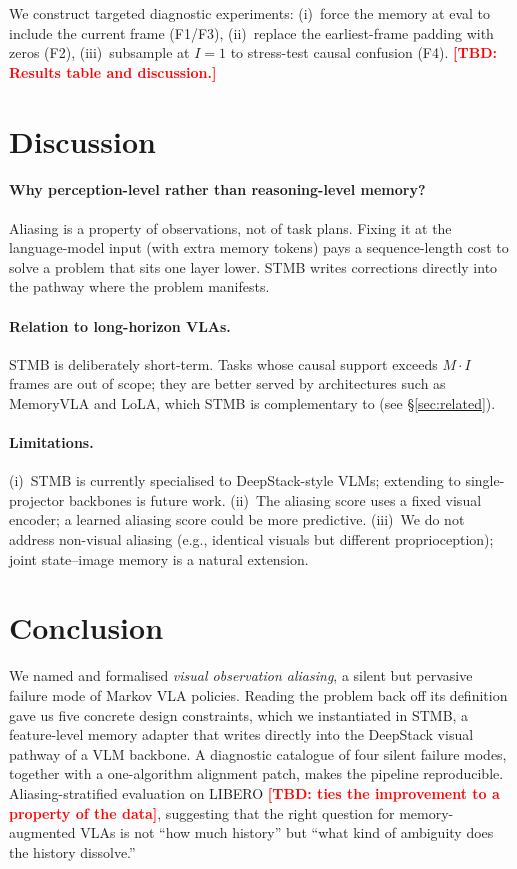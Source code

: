 \documentclass[11pt]{article}
\newcommand{\todo}[1]{\textcolor{red}{\textbf{[TBD: #1]}}}
\begin{document}
We construct targeted diagnostic experiments: (i)~force the memory at eval to
include the current frame (F1/F3), (ii)~replace the earliest-frame padding with
zeros (F2), (iii)~subsample at $I{=}1$ to stress-test causal confusion (F4).
\todo{Results table and discussion.}

\section{Discussion}
\label{sec:discussion}

\paragraph{Why perception-level rather than reasoning-level memory?}
Aliasing is a property of observations, not of task plans. Fixing it at the
language-model input (with extra memory tokens) pays a sequence-length cost
to solve a problem that sits one layer lower. STMB writes corrections directly
into the pathway where the problem manifests.

\paragraph{Relation to long-horizon VLAs.}
STMB is deliberately short-term. Tasks whose causal support exceeds $M \cdot I$
frames are out of scope; they are better served by architectures such as
MemoryVLA and LoLA, which STMB is complementary to (see \S\ref{sec:related}).

\paragraph{Limitations.}
(i)~STMB is currently specialised to DeepStack-style VLMs; extending to
single-projector backbones is future work. (ii)~The aliasing score uses a
fixed visual encoder; a learned aliasing score could be more predictive.
(iii)~We do not address non-visual aliasing (e.g., identical visuals but
different proprioception); joint state--image memory is a natural extension.

\section{Conclusion}

We named and formalised \emph{visual observation aliasing}, a silent but
pervasive failure mode of Markov VLA policies. Reading the problem back off its
definition gave us five concrete design constraints, which we instantiated in
STMB, a feature-level memory adapter that writes directly into the DeepStack
visual pathway of a VLM backbone. A diagnostic catalogue of four silent
failure modes, together with a one-algorithm alignment patch, makes the
pipeline reproducible.
Aliasing-stratified evaluation on LIBERO \todo{ties the improvement to a
property of the data}, suggesting that the right question for
memory-augmented VLAs is not ``how much history'' but ``what kind of
ambiguity does the history dissolve.''
\end{document}
